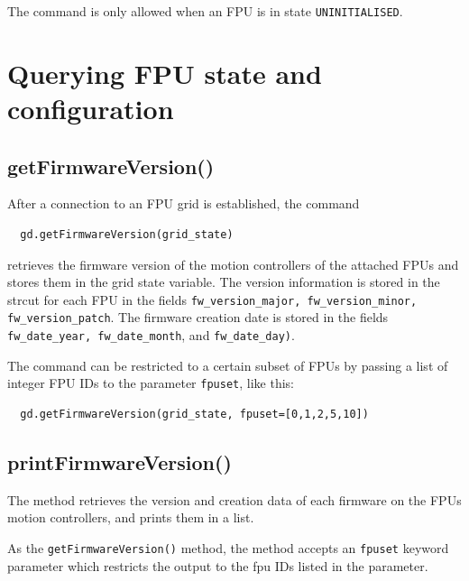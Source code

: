 \documentclass[fontsize=12,a4paper]{scrreprt}
\begin{document}
The command is only allowed when an FPU is in state \texttt{UNINITIALISED}.


\chapter{Querying FPU state and configuration}

\minitoc

\section{getFirmwareVersion()}
\label{sec:getfirmwareversion}

After a connection to an FPU grid is established, the command
\begin{verbatim}
  gd.getFirmwareVersion(grid_state)
\end{verbatim}
retrieves the firmware version of the motion controllers of the
attached FPUs and stores them in the grid state variable. The version
information is stored in the strcut for each FPU in the fields
\texttt{fw\_version\_major, fw\_version\_minor, fw\_version\_patch}.
The firmware creation date is stored in the fields
\texttt{fw\_date\_year, fw\_date\_month}, and \texttt{fw\_date\_day)}.

The command can be restricted to a certain subset of FPUs
by passing a list of integer FPU IDs to the parameter
\texttt{fpuset}, like this:

\begin{verbatim}
  gd.getFirmwareVersion(grid_state, fpuset=[0,1,2,5,10])
\end{verbatim}



\section{printFirmwareVersion()}
\label{sec:printfirmwareversion}

The method retrieves the version and creation data of each firmware on
the FPUs motion controllers, and prints them in a list.

As the \texttt{getFirmwareVersion()} method, the method accepts an
\texttt{fpuset} keyword parameter which restricts the output to the fpu IDs
listed in the parameter.
\end{document}

